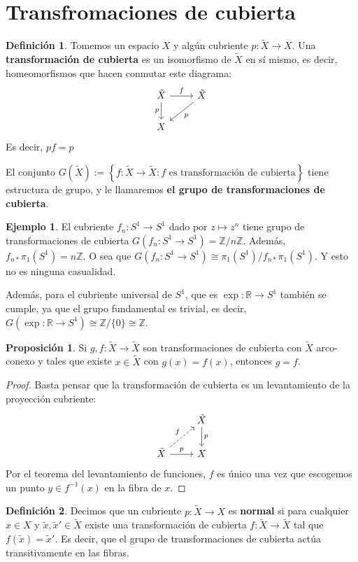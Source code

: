 \documentclass[spanish]{book}
\theoremstyle{definition}
\newtheorem*{defn}{Definición}
\newtheorem*{prop}{Proposición}
\newtheorem*{ejem}{Ejemplo}
\newcommand{\R}{\mathbb{R}}
\newcommand{\Z}{\mathbb{Z}}
\begin{document}
\section{Transfromaciones de cubierta}
	\begin{defn}
		Tomemos un espacio $X$ y algún cubriente $p:\tilde{X}\to X$. Una \textbf{transformación de cubierta} es un isomorfismo de $\tilde{X}$ en sí mismo, es decir, homeomorfismos que hacen conmutar este diagrama:
		\[\begin{tikzcd}
			\tilde{X}\arrow[r,"f"]\arrow[d,swap,"p"]&\tilde{X}\arrow[dl,"p"]\\
			X
		\end{tikzcd}\]
		Es decir, $pf=p$
	\end{defn}
		El conjunto $G(\tilde{X}):=\left\{f:\tilde{X}\to\tilde{X}:f\text{ es transformación de cubierta}\right\}$ tiene estructura de grupo, y le llamaremos \textbf{el grupo de transformaciones de cubierta}.
	\begin{ejem}
		El cubriente $f_n:S^1\to S^1$ dado por $z\mapsto z^n$ tiene grupo de transformaciones de cubierta $G(f_n:S^1\to S^1)=\Z/n\Z$. Además, $f_{n*}\pi_1(S^1)=n\Z$. O sea que $G(f_n:S^1\to S^1)\cong\pi_1(S^1)/f_{n*}\pi_1(S^1)$. Y esto no es ninguna casualidad.
		
		Además, para el cubriente universal de $S^1$, que es $\exp:\R\to S^1$ también se cumple, ya que el grupo fundamental es trivial, es decir, $G(\exp:\R\to S^1)\cong\Z/\{0\}\cong\Z$.
	\end{ejem}
	\begin{prop}
		Si $g,f:\tilde{X}\to\tilde{X}$ son transformaciones de cubierta con $\tilde{X}$ arco-conexo y tales que existe $x\in\tilde{X}$ con $g(x)=f(x)$, entonces $g=f$.
	\end{prop}
	\begin{proof}
		Basta pensar que la transformación de cubierta es un levantamiento de la proyección cubriente:
		\[\begin{tikzcd}
			&\tilde{X}\arrow[d,"p"]\\
			\tilde{X}\arrow[ur,dashed,"f"]\arrow[r,"p"]&X
		\end{tikzcd}\]
		Por el teorema del levantamiento de funciones, $f$ es único una vez que escogemos un punto $y\in f^{-1}(x)$ en la fibra de $x$.
	\end{proof}
	\begin{defn}
		Decimos que un cubriente $p:\tilde{X}\to X$ es \textbf{normal} si para cualquier $x\in X$ y $\tilde{x},\tilde{x}'\in\tilde{X}$ existe una transformación de cubierta $f:\tilde{X}\to\tilde{X}$ tal que $f(\tilde{x})=\tilde{x}'$. Es decir, que el grupo de transformaciones de cubierta actúa transitivamente en las fibras.
	\end{defn}
\end{document}
